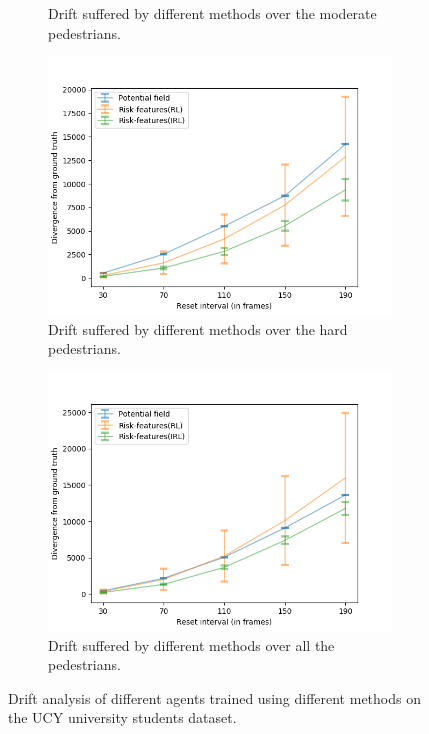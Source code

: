 \begin{figure}[htbp]
\begin{subfigure}{0.5\textwidth}
		\caption{Drift suffered by different methods over the moderate pedestrians.}
		\label{fig:inter_method-drift_analysis_med}
	\end{subfigure}
	\begin{subfigure}{0.5\textwidth}
		\centering
		\includegraphics[width=\linewidth]{plots/ucy_inter_method_new/drift_hard_ucy_inter_method.png}
		\caption{Drift suffered by different methods over the hard pedestrians.}
		\label{fig:inter_method-drift_analysis_hard}
	\end{subfigure}
	\begin{subfigure}{0.5\textwidth}
		\centering
		\includegraphics[width=\linewidth]{plots/ucy_inter_method_new/drift_all_ucy_inter_method.png}
		\caption{Drift suffered by different methods over all the pedestrians.}
		\label{fig:inter_method-drift_analysis_all}
	\end{subfigure}
	\caption{Drift analysis of different agents trained using different methods on the UCY university students dataset.}
\end{figure}


